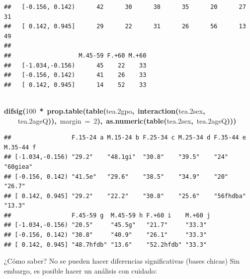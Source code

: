 \documentclass{article}
\makeatletter
\newcommand{\hlnumber}[1]{\textcolor[rgb]{0,0,0}{#1}}%
\newcommand{\hlfunctioncall}[1]{\textcolor[rgb]{.5,0,.33}{\textbf{#1}}}%
\newcommand{\hlkeyword}[1]{\textbf{#1}}%
\newcommand{\hlargument}[1]{\textcolor[rgb]{.69,.25,.02}{#1}}%
\newcommand{\hlsymbol}[1]{#1}%
\newcommand{\hlstd}[1]{\textcolor[rgb]{0,0,0}{#1}}%
\newenvironment{kframe}{%
 \def\FrameCommand##1{\hskip\@totalleftmargin \hskip-\fboxsep
 \colorbox{shadecolor}{##1}\hskip-\fboxsep
     \hskip-\linewidth \hskip-\@totalleftmargin \hskip\columnwidth}%
 \MakeFramed {\advance\hsize-\width
   \@totalleftmargin\z@ \linewidth\hsize
   \@setminipage}}%
 {\par\unskip\endMakeFramed}
\newenvironment{knitrout}{}{} %
\makeatother
\begin{document}
\begin{knitrout}
{\begin{kframe}
\begin{verbatim}
##   [-0.156, 0.142)      42      30      38      35      20      27      31
##   [ 0.142, 0.945]      29      22      31      26      56      13      49
##                  
##                   M.45-59 F.+60 M.+60
##   [-1.034,-0.156)      45    22    33
##   [-0.156, 0.142)      41    26    33
##   [ 0.142, 0.945]      14    52    33
\end{verbatim}
\begin{flushleft}
\ttfamily\noindent
\hspace*{\fill}\\
\hlstd{}\hlfunctioncall{difsig}\hlkeyword{(}\hlnumber{100}{\ }\hlkeyword{*}{\ }\hlfunctioncall{prop.table}\hlkeyword{(}\hlfunctioncall{table}\hlkeyword{(}\hlsymbol{tea.2}\hlkeyword{\usebox{\hlnormalsizeboxdollar}}\hlsymbol{gpo}\hlkeyword{,}{\ }\hlfunctioncall{interaction}\hlkeyword{(}\hlsymbol{tea.2}\hlkeyword{\usebox{\hlnormalsizeboxdollar}}\hlsymbol{sex}\hlkeyword{,}\hspace*{\fill}\\
\hlstd{}{\ }{\ }{\ }{\ }\hlsymbol{tea.2}\hlkeyword{\usebox{\hlnormalsizeboxdollar}}\hlsymbol{age\usebox{\hlnormalsizeboxunderscore}Q}\hlkeyword{)}\hlkeyword{)}\hlkeyword{,}{\ }\hlargument{margin}{\ }\hlargument{=}{\ }\hlnumber{2}\hlkeyword{)}\hlkeyword{,}{\ }\hlfunctioncall{as.numeric}\hlkeyword{(}\hlfunctioncall{table}\hlkeyword{(}\hlsymbol{tea.2}\hlkeyword{\usebox{\hlnormalsizeboxdollar}}\hlsymbol{sex}\hlkeyword{,}{\ }\hlsymbol{tea.2}\hlkeyword{\usebox{\hlnormalsizeboxdollar}}\hlsymbol{age\usebox{\hlnormalsizeboxunderscore}Q}\hlkeyword{)}\hlkeyword{)}\hlkeyword{)}\mbox{}
\normalfont
\end{flushleft}
\begin{verbatim}
##                 F.15-24 a M.15-24 b F.25-34 c M.25-34 d F.35-44 e M.35-44 f
## [-1.034,-0.156) "29.2"    "48.1gi"  "30.8"    "39.5"    "24"      "60giea" 
## [-0.156, 0.142) "41.5e"   "29.6"    "38.5"    "34.9"    "20"      "26.7"   
## [ 0.142, 0.945] "29.2"    "22.2"    "30.8"    "25.6"    "56fhdba" "13.3"   
##                 F.45-59 g  M.45-59 h F.+60 i    M.+60 j
## [-1.034,-0.156) "20.5"     "45.5g"   "21.7"     "33.3" 
## [-0.156, 0.142) "30.8"     "40.9"    "26.1"     "33.3" 
## [ 0.142, 0.945] "48.7hfdb" "13.6"    "52.2hfdb" "33.3" 
\end{verbatim}
\end{kframe}}
\end{knitrout}

¿Cómo saber? No se pueden hacer diferencias significativas (bases chicas)
Sin embargo, es posible hacer un análisis con cuidado:
\end{document}
